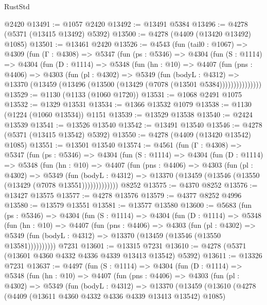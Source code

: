 \begin{lexlean}{RustStd}
\begin{coremodule}
    @2420
@13491 := @1057 @2420
@13492 := @13491 @5384
@13496 := @4278 (@5371 (@13415 @13492) @5392)
@13500 := @4278 (@4409 (@13420 @13492) @1085)
@13501 := @13461 @2420
@13526 := @4543
    (fun (tail0 : @1067) =>
    @4309
      (fun (Γ : @4308) =>
      @5347
        (fun (ps : @5346) =>
        @4304
          (fun (S : @1114) =>
          @4304
            (fun (D : @1114) =>
            @5348
              (fun (hn : @10) =>
              @4407
                (fun (pns : @4406) =>
                @4303
                  (fun (pl : @4302) =>
                  @5349
                    (fun (bodyL : @4312) =>
                    @13370 (@13459 (@13496 (@13500 (@13429 (@7078 (@13501 @5384)))))))))))))))
@13529 := @1130 (@1133 (@1060 @1720))
@13531 := @1068 @2491 @1075
@13532 := @1329 @13531
@13534 := @1366 @13532 @1079
@13538 := @1130 (@1224 (@1060 @13534)) @1151
@13539 := @13529 @13538
@13540 := @2424 @13539
@13541 := @13526 @13540
@13542 := @13491 @13540
@13546 := @4278 (@5371 (@13415 @13542) @5392)
@13550 := @4278 (@4409 (@13420 @13542) @1085)
@13551 := @13501 @13540
@13574 := @4561
    (fun (Γ : @4308) =>
    @5347
      (fun (ps : @5346) =>
      @4304
        (fun (S : @1114) =>
        @4304
          (fun (D : @1114) =>
          @5348
            (fun (hn : @10) =>
            @4407
              (fun (pns : @4406) =>
              @4303
                (fun (pl : @4302) =>
                @5349
                  (fun (bodyL : @4312) =>
                  @13370 (@13459 (@13546 (@13550 (@13429 (@7078 @13551)))))))))))))
    @8252
@13575 := @4370 @8252
@13576 := @13427 @13575
@13577 := @4278 @13576
@13579 := @4377 @8252 @4996
@13580 := @13579 @13551
@13581 := @13577 @13580
@13600 := @5683
    (fun (ps : @5346) =>
    @4304
      (fun (S : @1114) =>
      @4304
        (fun (D : @1114) =>
        @5348
          (fun (hn : @10) =>
          @4407
            (fun (pns : @4406) =>
            @4303
              (fun (pl : @4302) =>
              @5349 (fun (bodyL : @4312) => @13370 (@13459 (@13546 (@13550 @13581))))))))))
    @7231
@13601 := @13315 @7231
@13610 := @4278 (@5371 (@13601 @4360 @4332 @4336 @4339 @13413 @13542) @5392)
@13611 := @13326 @7231
@13637 := @4497
    (fun (S : @1114) =>
    @4304
      (fun (D : @1114) =>
      @5348
        (fun (hn : @10) =>
        @4407
          (fun (pns : @4406) =>
          @4303
            (fun (pl : @4302) =>
            @5349
              (fun (bodyL : @4312) =>
              @13370
                (@13459
                  (@13610
                    (@4278
                      (@4409 (@13611 @4360 @4332 @4336 @4339 @13413 @13542) @1085)

\end{coremodule}
\end{lexlean}
